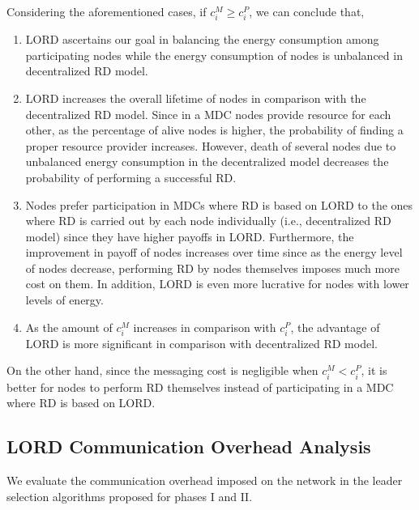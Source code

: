 \documentclass[journal,12pt, onecolumn]{IEEEtran}
\begin{document}
Considering the aforementioned cases, if $c_i ^{M} \geq c_i ^{P}$, we can conclude that,
\begin{enumerate}
\item LORD ascertains our goal in balancing the energy consumption among participating nodes while the energy consumption of nodes is unbalanced in decentralized RD model.
\item LORD increases the overall lifetime of nodes in comparison with the decentralized RD model. Since in a MDC nodes provide resource for each other, as the percentage of alive nodes is higher, the probability of finding a proper resource provider increases. However, death of several nodes due to unbalanced energy consumption in the decentralized model decreases the probability of performing a successful RD.
\item Nodes prefer participation in MDCs where RD is based on LORD to the ones where RD is carried out by each node individually (i.e., decentralized RD model) since they have higher payoffs in LORD. Furthermore, the improvement in payoff of nodes increases over time since as the energy level of nodes decrease, performing RD by nodes themselves imposes much more cost on them. In addition, LORD is even more lucrative for nodes with lower levels of energy.

\item As the amount of $c_i ^{M}$ increases in comparison with $c_i ^{P}$, the advantage of LORD is more significant in comparison with decentralized RD model.  
\end{enumerate}

On the other hand, since the messaging cost is negligible when $c_i ^{M} < c_i ^{P}$, it is better for nodes to perform RD themselves instead of participating in a MDC where RD is based on LORD.

\subsection{LORD Communication Overhead Analysis}
We evaluate the communication overhead imposed on the network in the leader selection algorithms proposed for phases I and II. 
\end{document}
